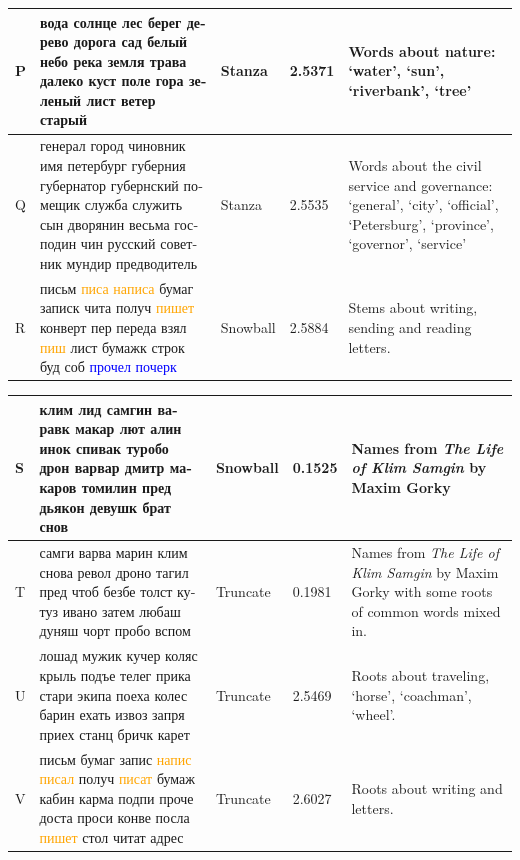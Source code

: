 \documentclass[11pt,a4paper]{article}
\begin{document}
\begin{landscape}
\begin{center}
\begin{tabularx}{\textwidth}{|l|X|l|l|X|}
    P & \foreignlanguage{russian}{вода солнце лес берег дерево дорога сад белый небо река земля трава далеко куст поле гора зеленый лист ветер старый} & Stanza & 2.5371 & Words about nature: `water', `sun', `riverbank', `tree' \\ \hline
    Q & \foreignlanguage{russian}{генерал город чиновник имя петербург губерния губернатор губернский помещик служба служить сын дворянин весьма господин чин русский советник мундир предводитель} & Stanza & 2.5535 & Words about the civil service and governance: `general', `city', `official', `Petersburg', `province', `governor', `service' \\ \hline
    R & \foreignlanguage{russian}{письм \textcolor{orange}{писа написа} бумаг записк чита получ \textcolor{orange}{пишет} конверт пер переда взял \textcolor{orange}{пиш} лист бумажк строк буд соб \textcolor{blue}{прочел почерк}} & Snowball & 2.5884 & Stems about writing, sending and reading letters. \\ \hline
    \end{tabularx}
\end{center}
    \begin{tabularx}{\textwidth}{|l|X|l|l|X|}\hline
    S & \foreignlanguage{russian}{клим лид самгин варавк макар лют алин инок спивак туробо дрон варвар дмитр макаров томилин пред дьякон девушк брат снов} & Snowball & 0.1525 & Names from \textit{The Life of Klim Samgin} by Maxim Gorky \\ \hline
    T & \foreignlanguage{russian}{самги варва марин клим снова револ дроно тагил пред чтоб безбе толст кутуз ивано затем любаш дуняш чорт пробо вспом} & Truncate & 0.1981 & Names from \textit{The Life of Klim Samgin} by Maxim Gorky with some roots of common words mixed in. \\ \hline
    U & \foreignlanguage{russian}{лошад мужик кучер коляс крыль подъе телег прика стари экипа поеха колес барин ехать извоз запря приех станц бричк карет} & Truncate & 2.5469 & Roots about traveling, `horse', `coachman', `wheel'. \\ \hline
    V & \foreignlanguage{russian}{письм бумаг запис \textcolor{orange}{напис писал} получ \textcolor{orange}{писат} бумаж кабин карма подпи проче доста проси конве посла \textcolor{orange}{пишет} стол читат адрес} & Truncate & 2.6027 & Roots about writing and letters. \\ \hline
    \end{tabularx}

\end{landscape}
\end{document}
